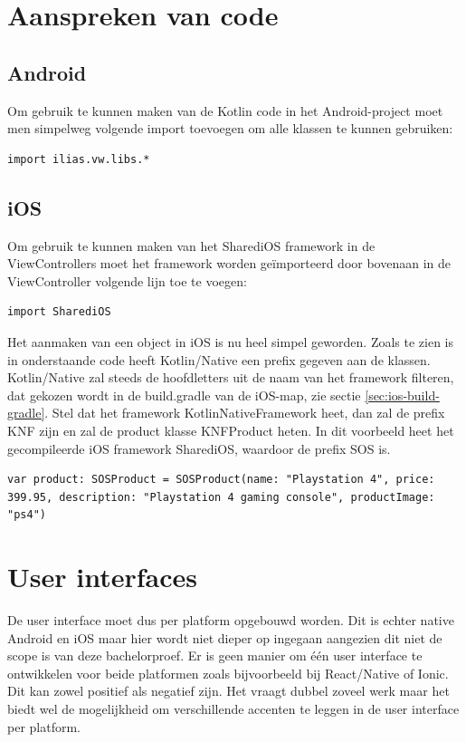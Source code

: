 \section{Aanspreken van code}
\subsection{Android}
Om gebruik te kunnen maken van de Kotlin code in het Android-project moet men simpelweg volgende import toevoegen om alle klassen te kunnen gebruiken: 

\begin{lstlisting}
import ilias.vw.libs.*
\end{lstlisting}

\subsection{iOS}
Om gebruik te kunnen maken van het SharediOS framework in de ViewControllers moet het framework worden geïmporteerd door bovenaan in de ViewController volgende lijn toe te voegen:

\begin{lstlisting}
import SharediOS
\end{lstlisting}

Het aanmaken van een object in iOS is nu heel simpel geworden. Zoals te zien is in onderstaande code heeft Kotlin/Native een prefix gegeven aan de klassen. Kotlin/Native zal steeds de hoofdletters uit de naam van het framework filteren, dat gekozen wordt in de build.gradle van de iOS-map, zie sectie \ref{sec:ios-build-gradle}. Stel dat het framework KotlinNativeFramework heet, dan zal de prefix KNF zijn en zal de product klasse KNFProduct heten. In dit voorbeeld heet het gecompileerde iOS framework SharediOS, waardoor de prefix SOS is.

\begin{lstlisting}
var product: SOSProduct = SOSProduct(name: "Playstation 4", price: 399.95, description: "Playstation 4 gaming console", productImage: "ps4")
\end{lstlisting}

\section{User interfaces}
De user interface moet dus per platform opgebouwd worden. Dit is echter native Android en iOS maar hier wordt niet dieper op ingegaan aangezien dit niet de scope is van deze bachelorproef. Er is geen manier om één user interface te ontwikkelen voor beide platformen zoals bijvoorbeeld bij React/Native of Ionic. Dit kan zowel positief als negatief zijn. Het vraagt dubbel zoveel werk maar het biedt wel de mogelijkheid om verschillende accenten te leggen in de user interface per platform.

